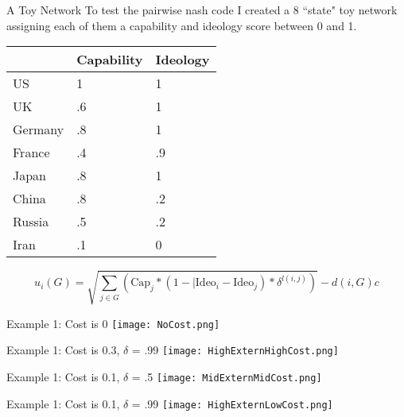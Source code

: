 \documentclass{beamer}
\begin{document}
\begin{frame}{A Toy Network}
To test the pairwise nash code I created a 8 ``state" toy network assigning each of them a capability and ideology score between 0 and 1.
\begin{table}
    \begin{tabular}{|l|l|l|}
        \hline
        ~       & Capability & Ideology \\ \hline
        US      & 1          & 1        \\ 
        UK      & .6         & 1        \\ 
        Germany & .8         & 1        \\ 
        France  & .4         & .9       \\ 
        Japan   & .8         & 1        \\ 
        China   & .8         & .2       \\ 
        Russia  & .5         & .2       \\ 
        Iran    & .1         & 0        \\
        \hline
    \end{tabular}
\end{table}
\begin{equation}
u_{i}(G) = \sqrt{\sum_{j \in G} (\text{Cap}_{j} * (1-|\text{Ideo}_{i} - \text{Ideo}_{j}) * \delta^{l(i,j)})} - d(i,G)c
\end{equation}
\end{frame}

\begin{frame}[shrink]{Example 1: Cost is 0}
\texttt{[image: NoCost.png]}
\end{frame}

\begin{frame}[shrink]{Example 1: Cost is 0.3, $\delta$ = .99}
\texttt{[image: HighExternHighCost.png]}
\end{frame}

\begin{frame}[shrink]{Example 1: Cost is 0.1, $\delta$ = .5}
\texttt{[image: MidExternMidCost.png]}
\end{frame}

\begin{frame}[shrink]{Example 1: Cost is 0.1, $\delta$ = .99}
\texttt{[image: HighExternLowCost.png]}
\end{frame}
\end{document}
